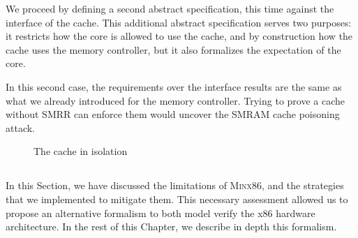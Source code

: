 \begin{example}
  We proceed by defining a second abstract specification, this time against the
  interface of the cache.
  This additional abstract specification serves two purposes: it restricts how
  the core is allowed to use the cache, and by construction how the cache uses
  the memory controller, but it also formalizes the expectation of the core.

  In this second case, the requirements over the interface results are the same
  as what we already introduced for the memory controller.
  Trying to prove a cache without SMRR can enforce them would uncover the SMRAM
  cache poisoning attack.
\end{example}

\begin{figure}
  \centering

  \caption{The cache in isolation}
  \label{fig:freespec:cachec}
\end{figure}

\subsection*{}

In this Section, we have discussed the limitations of {\scshape Minx86}, and the
strategies that we implemented to mitigate them.
%
This necessary assessment allowed us to propose an alternative formalism to both
model verify the x86 hardware architecture.
%
In the rest of this Chapter, we describe in depth this formalism.

